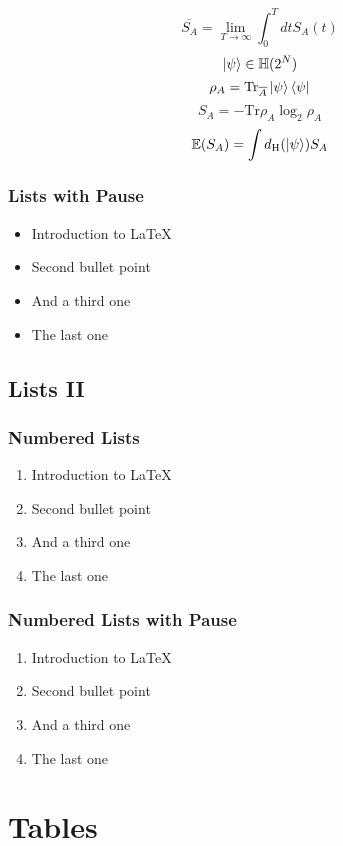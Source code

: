 \documentclass{beamer}
\begin{document}
\begin{frame}
   \[
      \overline{S_A}=\lim_{T\to\infty}\int_0^T dt S_{A}(t)
   \]
   \[
      {\ket{\psi}\in\mathbb{H}(2^N)}
   \]
   \[
      \rho_A=\mathrm{Tr}_{\overline{A}}\ket{\psi}\bra{\psi}
   \]
   \[
      S_A=-\mathrm{Tr}\rho_A\log_{2}\rho_A   
   \]
   \[
      \mathbb{E}(S_A)=\int d_\mathrm{H}(\ket{\psi})S_A   
   \]
\end{frame}
\begin{frame}\frametitle{Lists with Pause}
   \begin{itemize}
      \item Introduction to  \LaTeX \pause 
      \item Second bullet point \pause 
      \item And a third one \pause 
      \item The last one
   \end{itemize} 
\end{frame}



\subsection{Lists II}
\begin{frame}
   \frametitle{Numbered Lists}
   \begin{enumerate}
      \item Introduction to  \LaTeX  
      \item Second bullet point 
      \item And a third one
      \item The last one
   \end{enumerate}
\end{frame}



\begin{frame}
   \frametitle{Numbered Lists with Pause}
   \begin{enumerate}
      \item Introduction to  \LaTeX \pause 
      \item Second bullet point \pause 
      \item And a third one \pause 
      \item The last one
   \end{enumerate}
\end{frame}



\section{Tables} 
\end{document}

